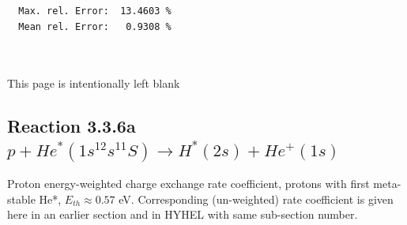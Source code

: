 \documentclass[12pt,dvipdfmx]{article}
\begin{document}
\begin{small}
\begin{verbatim}
  Max. rel. Error:  13.4603 %
  Mean rel. Error:   0.9308 %



\end{verbatim}\end{small}

\newpage
This page is intentionally left blank
\newpage

\subsection{
Reaction 3.3.6a $   p + He^*(1s^12s^11S) \rightarrow H^*(2s) + He^+(1s) $
}
Proton energy-weighted charge exchange rate coefficient,
protons with first meta-stable He*, $E_{th} \approx 0.57$ eV.
Corresponding (un-weighted) rate coefficient is given here in an earlier section and in HYHEL with same sub-section number.
\end{document}
